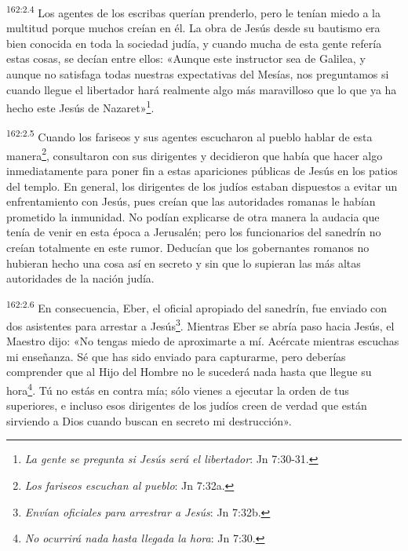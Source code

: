 \par 
\textsuperscript{162:2.4} Los agentes de los escribas querían prenderlo, pero le tenían miedo a la multitud porque muchos creían en él. La obra de Jesús desde su bautismo era bien conocida en toda la sociedad judía, y cuando mucha de esta gente refería estas cosas, se decían entre ellos: «Aunque este instructor sea de Galilea, y aunque no satisfaga todas nuestras expectativas del Mesías, nos preguntamos si cuando llegue el libertador hará realmente algo más maravilloso que lo que ya ha hecho este Jesús de Nazaret»\footnote{\textit{La gente se pregunta si Jesús será el libertador}: Jn 7:30-31.}.

\par 
\textsuperscript{162:2.5} Cuando los fariseos y sus agentes escucharon al pueblo hablar de esta manera\footnote{\textit{Los fariseos escuchan al pueblo}: Jn 7:32a.}, consultaron con sus dirigentes y decidieron que había que hacer algo inmediatamente para poner fin a estas apariciones públicas de Jesús en los patios del templo. En general, los dirigentes de los judíos estaban dispuestos a evitar un enfrentamiento con Jesús, pues creían que las autoridades romanas le habían prometido la inmunidad. No podían explicarse de otra manera la audacia que tenía de venir en esta época a Jerusalén; pero los funcionarios del sanedrín no creían totalmente en este rumor. Deducían que los gobernantes romanos no hubieran hecho una cosa así en secreto y sin que lo supieran las más altas autoridades de la nación judía.

\par 
\textsuperscript{162:2.6} En consecuencia, Eber, el oficial apropiado del sanedrín, fue enviado con dos asistentes para arrestar a Jesús\footnote{\textit{Envían oficiales para arrestrar a Jesús}: Jn 7:32b.}. Mientras Eber se abría paso hacia Jesús, el Maestro dijo: «No tengas miedo de aproximarte a mí. Acércate mientras escuchas mi enseñanza. Sé que has sido enviado para capturarme, pero deberías comprender que al Hijo del Hombre no le sucederá nada hasta que llegue su hora\footnote{\textit{No ocurrirá nada hasta llegada la hora}: Jn 7:30.}. Tú no estás en contra mía; sólo vienes a ejecutar la orden de tus superiores, e incluso esos dirigentes de los judíos creen de verdad que están sirviendo a Dios cuando buscan en secreto mi destrucción».

